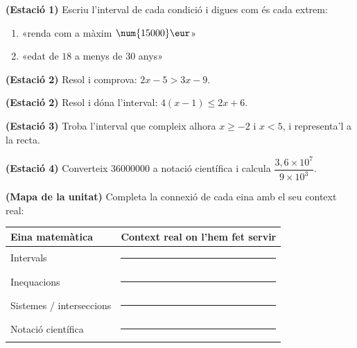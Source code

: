 \begin{exercicis}
\begin{exlist}
  \item \textbf{(Estació 1)} Escriu l'interval de cada condició i digues com és cada
        extrem:
        \begin{enumerate}[label=\alph*), leftmargin=1.6em, topsep=2pt]
          \item «renda com a màxim $\num{15000}\eur$»
          \item «edat de $18$ a menys de $30$ anys»
        \end{enumerate}
  \item \textbf{(Estació 2)} Resol i comprova: $2x-5>3x-9$.
  \item \textbf{(Estació 2)} Resol i dóna l'interval: $4(x-1)\le 2x+6$.
  \item \textbf{(Estació 3)} Troba l'interval que compleix alhora $x\ge -2$ i $x<5$,
        i representa'l a la recta.
  \item \textbf{(Estació 4)} Converteix $\num{36000000}$ a notació científica i
        calcula $\dfrac{3,6\times 10^{7}}{9\times 10^{3}}$.
  \item \textbf{(Mapa de la unitat)} Completa la connexió de cada eina amb el seu
        context real:
        \begin{center}
        \renewcommand{\arraystretch}{1.4}
        \begin{tabular}{p{4.6cm} p{8cm}}
        \toprule
        \textbf{Eina matemàtica} & \textbf{Context real on l'hem fet servir} \\
        \midrule
        Intervals & \rule{7.4cm}{0.4pt} \\
        Inequacions & \rule{7.4cm}{0.4pt} \\
        Sistemes / interseccions & \rule{7.4cm}{0.4pt} \\
        Notació científica & \rule{7.4cm}{0.4pt} \\
        \bottomrule
        \end{tabular}
        \end{center}
\end{exlist}
\end{exercicis}

